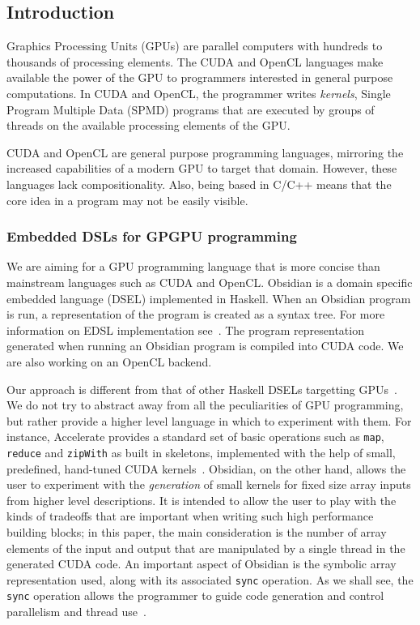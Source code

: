 

\subsection{Introduction} 

%


Graphics Processing Units (GPUs) are parallel computers with hundreds 
to thousands of processing elements. The CUDA and OpenCL languages  
make available the power of the GPU to programmers interested in general 
purpose computations. In CUDA and OpenCL, the programmer writes {\em kernels}, 
Single Program Multiple Data (SPMD) programs that are executed by groups 
of threads on the available processing elements of the GPU.  

CUDA and OpenCL are general purpose programming languages, mirroring the 
increased capabilities of a modern GPU to target that domain. However, these 
languages lack compositionality. 
Also, being based in C/C++ means that the core idea in a program may
not be easily visible.  

\subsubsection{Embedded DSLs for GPGPU programming} 
We are aiming for a GPU programming language that is more
concise than mainstream
languages such as CUDA and OpenCL. 
Obsidian is a
domain specific embedded language (DSEL) implemented in Haskell.
When an Obsidian program is run, a representation of the program is created 
as a syntax tree. For more information on EDSL implementation see~\cite{COMPILEEDSL}.
The program representation generated when running an Obsidian program 
is compiled into CUDA code. We are also working on an OpenCL backend.

Our approach is different from that of other Haskell DSELs targetting
GPUs~\cite{ACCELERATEDAMP11,NIKOLA,BARRACUDA}. 
We do not try to abstract away from 
all the peculiarities of GPU programming, but rather provide a higher 
level language in which to experiment with them.
For instance,
Accelerate provides a standard set of basic operations such as 
{\tt map}, {\tt reduce} and {\tt zipWith} as built in skeletons, implemented
with the help of small, predefined, hand-tuned CUDA kernels~\cite{ACCELERATEDAMP11}. 
Obsidian, on the other hand, allows the user to experiment with the
{\em generation} of small kernels for fixed size array inputs
from higher level descriptions.
It is intended to allow the user to play with the kinds of tradeoffs that are important
when writing such high performance building blocks; in this paper, the main consideration
is the number of array elements of the input and output that are manipulated
by a single thread in the generated CUDA code.
An important aspect of Obsidian is the symbolic array representation used, along
with its associated {\tt sync} operation. As we shall see, the {\tt sync} operation
allows the programmer to guide code generation and control parallelism and thread
use~\cite{JSLIC}.




